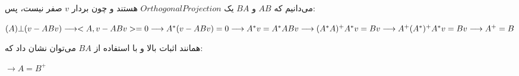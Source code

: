 می‌دانیم که $AB$ و $BA$ یک $Orthogonal Projection$ هستند و چون بردار $v$ صفر نیست، پس:

\setLTR
$
(A) \bot (v-ABv) \longrightarrow <A,v-ABv> = 0 \longrightarrow A^*(v-ABv)=0 \longrightarrow A^*v=A^*ABv\longrightarrow (A^*A)^+A^*v=Bv \\
\longrightarrow A^+(A^*)^+A^*v=Bv \longrightarrow A^+=B
$
\setRTL

همانند اثبات بالا و با استفاده از $BA$ می‌توان نشان داد که:

\setLTR
$
\longrightarrow A=B^+
$
\setRTL